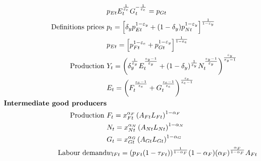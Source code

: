 \begin{align}
& p_{Et}E_t^\frac{1}{\varepsilon_e}G_t^{-\frac{1}{\varepsilon_e}}=p_{Gt}\nonumber\\
\text{Definitions prices}\ \vspace{4mm}&
p_{t}= \left[\delta_yp_{Et}^{1-\varepsilon_y}+(1-\delta_y)p_{Nt}^{1-\varepsilon_y}\right]^\frac{1}{1-\varepsilon_y}\nonumber\\
& p_{Et}= \left[p_{{F}t}^{1-\varepsilon_e}+p_{Gt}^{1-\varepsilon_y}\right]^\frac{1}{1-\varepsilon_e}\nonumber\\
\text{Production}\ \vspace{4mm}& 
Y_t=\left(\delta_y^\frac{1}{\varepsilon_y}E_t^\frac{\varepsilon_y-1}{\varepsilon_y}+(1-\delta_y)^\frac{1}{\varepsilon_y}N_t^\frac{\varepsilon_y-1}{\varepsilon_y}\right)^\frac{\varepsilon_y}{\varepsilon_y-1}\label{mod:y}\\
&E_t=\left({F}_t^\frac{\varepsilon_e-1}{\varepsilon_e}+G_t^\frac{\varepsilon_e-1}{\varepsilon_e}\right)^\frac{\varepsilon_e}{\varepsilon_e-1}\label{mod:E}\\
\text{\textbf{Intermediate good producers}}&\nonumber\\
\text{Production}\ \vspace{4mm}& F_t= x_{Ft}^{\alpha_F}\left(A_{Ft}L_{Ft}\right)^{1-\alpha_F}%
\label{mod:F}\\
&N_t= x_{Nt}^{\alpha_N}\left(A_{Nt}L_{Nt}\right)^{1-\alpha_N}%
\label{mod:N}\\
&G_t=  x_{Gt}^{\alpha_G}\left(A_{Gt}L_{Gt}\right)^{1-\alpha_G} %
\label{mod:G}\\
\text{Labour demand}%
& w_{lFt}=(p_{Ft}(1-\tau_{Ft}))^\frac{1}{1-\alpha_F}(1-\alpha_F)(\alpha_F)^\frac{\alpha_F}{1-\alpha_F}A_{Ft}\nonumber\\

\end{align}
